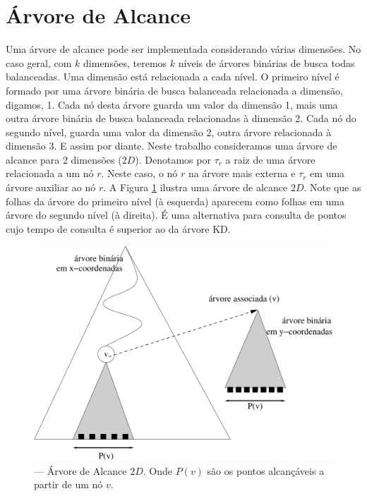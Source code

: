 


\section{Árvore de Alcance}\label{range-tree}

Uma árvore de alcance \cite{dsp_rt1} pode ser implementada considerando várias dimensões. No caso geral, com $k$ dimensões, teremos $k$ níveis de árvores binárias de busca todas balanceadas. Uma dimensão está relacionada a cada nível. O primeiro nível é formado por uma árvore binária de busca balanceada relacionada a dimensão, digamos, 1. Cada nó desta árvore guarda um valor da dimensão 1, mais uma outra árvore binária de busca balanceada relacionadas à dimensão 2. Cada nó do segundo nível, guarda uma valor da dimensão 2, outra árvore relacionada à dimensão 3. E assim por diante. Neste trabalho consideramos uma árvore de alcance para 2 dimensões ($2D$). Denotamos por $\tau_r$ a raiz de uma árvore relacionada a um nó $r$. Neste caso, o nó $r$ na árvore mais externa e $\tau_r$ em uma árvore auxiliar ao nó $r$. A Figura \ref{fig:8} ilustra uma árvore de alcance $2D$. Note que as folhas da árvore do primeiro nível (à esquerda) aparecem como folhas em uma árvore do segundo nível (à direita). É uma alternativa para consulta de pontos cujo tempo de consulta é superior ao da árvore KD.

\begin{figure}[htb]
    \begin{center}
        \includegraphics[scale=0.5]{images/range_tree1.pdf}
    \end{center}
    \caption{\label{fig:Fig_26} — Árvore de Alcance $2D$. Onde $P(v)$ são os pontos alcançáveis a partir de um nó $v$.}
    \label{fig:8}
\end{figure}

